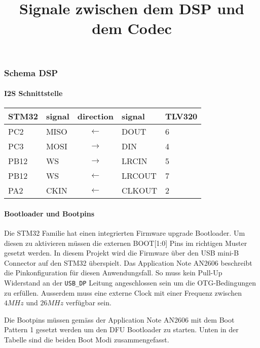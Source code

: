 \subsubsection{Schema DSP}
\label{sec:Schema_DSP}

\paragraph{I2S Schnittstelle}

\begin{table}[H]
\title{Signale zwischen dem DSP und dem Codec}
\centering
\begin{tabular}{|l|l|c|l|l|}
\hline
\textbf{STM32} & \textbf{signal} & \textbf{direction}         & \textbf{signal} & \textbf{TLV320} \\ \hline
PC2            & MISO            & $\leftarrow$  & DOUT            & 6               \\ \hline
PC3            & MOSI            & $\rightarrow$ & DIN             & 4               \\ \hline
PB12           & WS              & $\rightarrow$ & LRCIN           & 5               \\ \hline
PB12           & WS              & $\leftarrow$  & LRCOUT          & 7               \\ \hline
PA2            & CKIN            & $\leftarrow$  & CLKOUT          & 2               \\ \hline
\end{tabular}
\end{table}


\paragraph{Bootloader und Bootpins}

Die STM32 Familie hat einen integrierten Firmware upgrade Bootloader.
Um diesen zu aktivieren müssen die externen BOOT[1:0] Pins im richtigen Muster gesetzt werden.
In diesem Projekt wird die Firmware über den USB mini-B Connector auf den STM32 überspielt.
Das Application Note AN2606 \cite[p.136]{AN2606} beschreibt die Pinkonfiguration für diesen Anwendungsfall.
So muss kein Pull-Up Widerstand an der \texttt{USB\_DP} Leitung angeschlossen sein um die OTG-Bedingungen zu erfüllen.
Ausserdem muss eine externe Clock mit einer Frequenz zwischen $4\si{MHz}$ und $26\si{MHz}$ verfügbar sein.

Die Bootpins müssen gemäss der Application Note AN2606 \cite[Table 2]{AN2606} mit dem Boot Pattern 1 gesetzt werden um den DFU Bootloader zu starten.
Unten in der Tabelle sind die beiden Boot Modi zusammengefasst.

